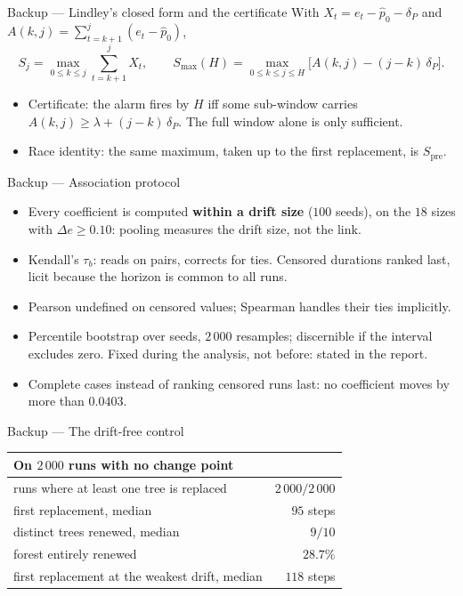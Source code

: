 \documentclass[aspectratio=169,11pt]{beamer}
\begin{document}
\begin{frame}{Backup --- Lindley's closed form and the certificate}
  With $X_t = e_t - \hat p_0 - \delta_P$ and $A(k,j) = \sum_{t=k+1}^{j} (e_t - \hat p_0)$,
  \[
    S_j = \max_{0 \le k \le j} \sum_{t=k+1}^{j} X_t,
    \qquad
    S_{\max}(H) = \max_{0 \le k \le j \le H} \big[A(k,j) - (j-k)\,\delta_P\big].
  \]
  \begin{itemize}
    \item Certificate: the alarm fires by $H$ iff some sub-window carries
          $A(k,j) \ge \lambda + (j-k)\,\delta_P$. The full window alone is only sufficient.
    \item Race identity: the same maximum, taken up to the first replacement, is $S_{\mathrm{pre}}$.
  \end{itemize}
\end{frame}

\begin{frame}{Backup --- Association protocol}
  \begin{itemize}
    \item Every coefficient is computed \textbf{within a drift size} ($100$ seeds), on the $18$
          sizes with $\Delta e \ge 0.10$: pooling measures the drift size, not the link.
    \item Kendall's $\tau_b$: reads on pairs, corrects for ties. Censored durations ranked last,
          licit because the horizon is common to all runs.
    \item Pearson undefined on censored values; Spearman handles their ties implicitly.
    \item Percentile bootstrap over seeds, $2\,000$ resamples; discernible if the interval
          excludes zero. Fixed during the analysis, not before: stated in the report.
    \item Complete cases instead of ranking censored runs last: no coefficient moves by more
          than $0.0403$.
  \end{itemize}
\end{frame}

\begin{frame}{Backup --- The drift-free control}
  \begin{center}
    \begin{tabular}{@{}lr@{}}
      \toprule
      On $2\,000$ runs with no change point & \\
      \midrule
      runs where at least one tree is replaced & $2\,000/2\,000$ \\
      first replacement, median & $95$ steps \\
      distinct trees renewed, median & $9/10$ \\
      forest entirely renewed & $28.7\%$ \\
      \midrule
      first replacement at the weakest drift, median & $118$ steps \\
      \bottomrule
    \end{tabular}
  \end{center}
\end{frame}
\end{document}
